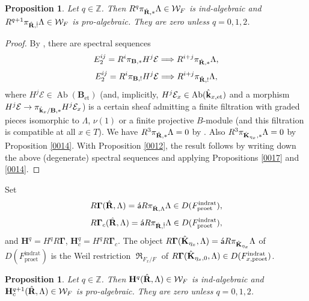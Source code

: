 \documentclass{amsart}
\newtheorem{Prop}[Thm]{Proposition}
\theoremstyle{remark}
\numberwithin{equation}{section}
\newcommand{\Z}{\mathbb{Z}}
\newcommand{\et}{\mathrm{et}}
\newcommand{\rat}{\mathrm{rat}}
\newcommand{\ind}{\mathrm{ind}}
\newcommand{\pro}{\mathrm{pro}}
\newcommand{\alg}[1]{\mathbf{#1}}
\newcommand{\algebrize}{\Acute{\mathsf{a}}}
\DeclareMathOperator{\Ab}{Ab}
\DeclareMathOperator{\Weil}{\mathfrak{R}}
\begin{document}
\begin{Prop} \label{0018}
	Let $q \in \Z$.
	Then $R^{q} \pi_{\Hat{\alg{R}}, \ast} \Lambda \in \mathcal{W}_{F}$ is ind-algebraic
	and $R^{q + 1} \pi_{\Hat{\alg{R}}, \Hat{!}} \Lambda \in \mathcal{W}_{F}$ is pro-algebraic.
	They are zero unless $q = 0, 1, 2$.
\end{Prop}

\begin{proof}
	By \cite[Section 9.3, Proposition 9.2.4, Propositions 9.3.1--3]{Suz24},
	there are spectral sequences
		\[
				E_{2}^{i j}
			=
				R^{i} \pi_{\alg{B}, \ast} H^{j} \mathcal{E}
			\Longrightarrow
				R^{i + j} \pi_{\Hat{\alg{R}}, \ast} \Lambda,
		\]
		\[
				E_{2}^{i j}
			=
				R^{i} \pi_{\alg{B}, !} H^{j} \mathcal{E}
			\Longrightarrow
				R^{i + j} \pi_{\Hat{\alg{R}}, !} \Lambda,
		\]
	where $H^{j} \mathcal{E} \in \Ab(\alg{B}_{\et})$
	(and, implicitly, $H^{j} \mathcal{E}_{x} \in \Ab(\Hat{\alg{k}}_{x, \et})$
	and a morphism $H^{j} \mathcal{E} \to \pi_{\Hat{\alg{k}}_{x} / \alg{B}, \ast} H^{j} \mathcal{E}_{x}$)
	is a certain sheaf admitting a finite filtration with graded pieces
	isomorphic to $\Lambda$, $\nu(1)$ or a finite projective $B$-module
	(and this filtration is compatible at all $x \in T$).
	We have $R^{3} \pi_{\Hat{\alg{R}}, \ast} \Lambda = 0$
	by \cite[Proposition 9.5.3]{Suz24}.
	Also $R^{3} \pi_{\Hat{\alg{K}}_{\eta_{x}}, \ast} \Lambda = 0$
	by Proposition \ref{0014}.
	With Proposition \ref{0012},
	the result follows by writing down the above (degenerate) spectral sequences
	and applying Propositions \ref{0017} and \ref{0014}.
\end{proof}

Set
	\[
			R \alg{\Gamma}(\Hat{\alg{R}}, \Lambda)
		=
			\algebrize R \pi_{\Hat{\alg{R}}, \Lambda} \Lambda
		\in
			D(F^{\ind\rat}_{\pro\et}),
	\]
	\[
			R \alg{\Gamma}_{c}(\Hat{\alg{R}}, \Lambda)
		=
			\algebrize R \pi_{\Hat{\alg{R}}, \Hat{!}} \Lambda
		\in
			D(F^{\ind\rat}_{\pro\et}),
	\]
and $\alg{H}^{q} = H^{q} R \alg{\Gamma}$, $\alg{H}^{q}_{c} = H^{q} R \alg{\Gamma}_{c}$.
The object $R \alg{\Gamma}(\Hat{\alg{K}}_{\eta_{x}}, \Lambda) = \algebrize R \pi_{\Hat{\alg{K}}_{\eta_{x}}} \Lambda$
of $D(F^{\ind\rat}_{\pro\et})$ is the Weil restriction $\Weil_{F_{x} / F}$ of
$R \alg{\Gamma}(\Hat{\alg{K}}_{\eta_{x}, 0}, \Lambda) \in D(F^{\ind\rat}_{x, \pro\et})$.

\begin{Prop} \label{0020}
	Let $q \in \Z$.
	Then $\alg{H}^{q}(\Hat{\alg{R}}, \Lambda) \in \mathcal{W}_{F}$ is ind-algebraic
	and $\alg{H}^{q + 1}_{c}(\Hat{\alg{R}}, \Lambda) \in \mathcal{W}_{F}$ is pro-algebraic.
	They are zero unless $q = 0, 1, 2$.
\end{Prop}
\end{document}
